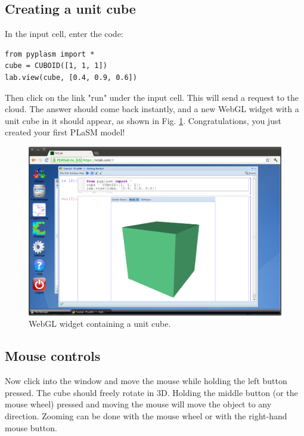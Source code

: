 \documentclass[article,A4,12pt]{llncs}
\begin{document}
\subsection{Creating a unit cube}

In the input cell, enter the code:

\begin{verbatim}
from pyplasm import *
cube = CUBOID([1, 1, 1])
lab.view(cube, [0.4, 0.9, 0.6])
\end{verbatim}
Then click on the link "run" under the input cell. This will send a request 
to the cloud. The answer should come back instantly, and a new WebGL widget 
with a unit cube in it should appear, as shown in Fig. \ref{fig:cube}. 
Congratulations, you just created your first PLaSM model!

\newpage

\begin{figure}[!ht]
\begin{center}
\includegraphics[width=\textwidth]{img/cube.png}
\end{center}
\caption{WebGL widget containing a unit cube.}
\label{fig:cube}
\end{figure}

\subsection{Mouse controls}

Now click into the window and move the mouse while holding the left
button pressed. The cube should freely rotate in 3D. Holding the middle
button (or the mouse wheel) pressed and moving the mouse will move the 
object to any direction. Zooming can be done with the mouse wheel or
with the right-hand mouse button.
\end{document}
